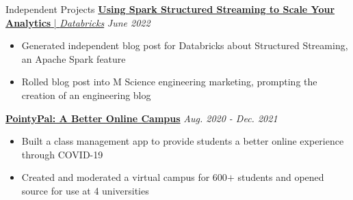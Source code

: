 \documentclass{resume/resume}
\begin{document}
\begin{rSection}{Independent Projects}
  \href{https://databricks.com/blog/2022/07/14/using-spark-structured-streaming-to-scale-your-analytics.html}{{\bf Using Spark Structured Streaming to Scale Your Analytics} | {\em Databricks}} \hfill {\em June 2022}
  \vspace{-6pt}
  \begin{itemize}[nosep]
    \item Generated independent blog post for Databricks about Structured Streaming, an Apache Spark feature
    \item Rolled blog post into M Science engineering marketing, prompting the creation of an engineering blog
  \end{itemize}
  

  \href{https://github.com/UtahTriangle/pointypal}{\bf PointyPal: A Better Online Campus} \hfill {\em Aug. 2020 - Dec. 2021}
  \vspace{-6pt}
  \begin{itemize}[nosep]
    \item Built a class management app to provide students a better online experience through COVID-19
    \item Created and moderated a virtual campus for 600$+$ students and opened source for use at 4 universities
  \end{itemize}


  

\end{rSection}
\end{document}
